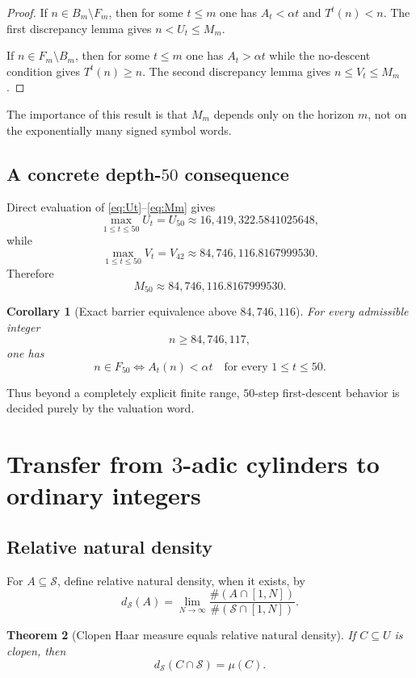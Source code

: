 \documentclass[11pt]{article}
\newtheorem{theorem}{Theorem}[section]
\newtheorem{corollary}[theorem]{Corollary}
\theoremstyle{definition}
\theoremstyle{remark}
\newcommand{\Sset}{\mathcal S}
\newcommand{\ds}{d_{\Sset}}
\begin{document}
\begin{proof}
If $n\in B_m\setminus F_m$, then for some $t\le m$ one has $A_t<\alpha t$ and $T^t(n)<n$.  The first discrepancy lemma gives $n<U_t\le M_m$.

If $n\in F_m\setminus B_m$, then for some $t\le m$ one has $A_t>\alpha t$ while the no-descent condition gives $T^t(n)\ge n$.  The second discrepancy lemma gives $n\le V_t\le M_m$.
\end{proof}

The importance of this result is that $M_m$ depends only on the horizon $m$, not on the exponentially many signed symbol words.

\subsection{A concrete depth-$50$ consequence}

Direct evaluation of \eqref{eq:Ut}--\eqref{eq:Mm} gives
\[
\max_{1\le t\le50}U_t
=U_{50}
\approx16,419,322.5841025648,
\]
while
\[
\max_{1\le t\le50}V_t
=V_{42}
\approx84,746,116.8167999530.
\]
Therefore
\begin{equation}
M_{50}\approx84,746,116.8167999530.
\label{eq:M50}
\end{equation}

\begin{corollary}[Exact barrier equivalence above $84,746,116$]
For every admissible integer
\[
n\ge84,746,117,
\]
one has
\[
n\in F_{50}
\iff
A_t(n)<\alpha t\quad\text{for every }1\le t\le50.
\]
\end{corollary}

Thus beyond a completely explicit finite range, $50$-step first-descent behavior is decided purely by the valuation word.

\section{Transfer from $3$-adic cylinders to ordinary integers}

\subsection{Relative natural density}

For $A\subseteq\Sset$, define relative natural density, when it exists, by
\[
\ds(A)
=
\lim_{N\to\infty}
\frac{\#(A\cap[1,N])}{\#(\Sset\cap[1,N])}.
\]

\begin{theorem}[Clopen Haar measure equals relative natural density]
If $C\subseteq U$ is clopen, then
\[
\ds(C\cap\Sset)=\mu(C).
\]
\end{theorem}
\end{document}
